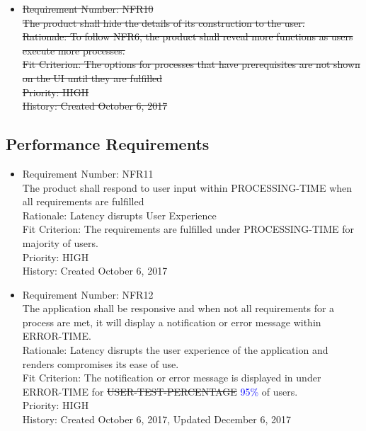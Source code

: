 \documentclass[12pt, titlepage]{article}
\begin{document}
\begin{itemize}
	\item \sout{Requirement Number: NFR10}\\
\sout{The product shall hide the details of its construction to the user.}\\
\sout{Rationale: To follow NFR6, the product shall reveal more functions as users execute more processes.}\\
\sout{Fit Criterion: The options for processes that have prerequisites are not shown on the UI until they are fulfilled}\\
\sout{Priority: HIGH}\\
\sout{History: Created October 6, 2017}
		
\end{itemize}

\subsection{Performance Requirements}
\begin{itemize}
	\item Requirement Number: NFR11\\
The product shall respond to user input within PROCESSING-TIME when all requirements are fulfilled\\
Rationale:  Latency disrupts User Experience\\
Fit Criterion: The requirements are fulfilled under PROCESSING-TIME for majority of users.\\
Priority: HIGH\\
History: Created October 6, 2017

	\item Requirement Number: NFR12\\
The application shall be responsive and when not all requirements for a process are met,  it will display a notification or error message within ERROR-TIME.  \\
Rationale: Latency disrupts the user experience of the application and renders compromises its ease of use.  \\
Fit Criterion: The notification or error message is displayed in under ERROR-TIME for \sout{USER-TEST-PERCENTAGE} \textcolor{blue}{95\%} of users.  \\
Priority: HIGH\\
History: Created October 6, 2017, Updated December 6, 2017

\end{itemize}
\end{document}
